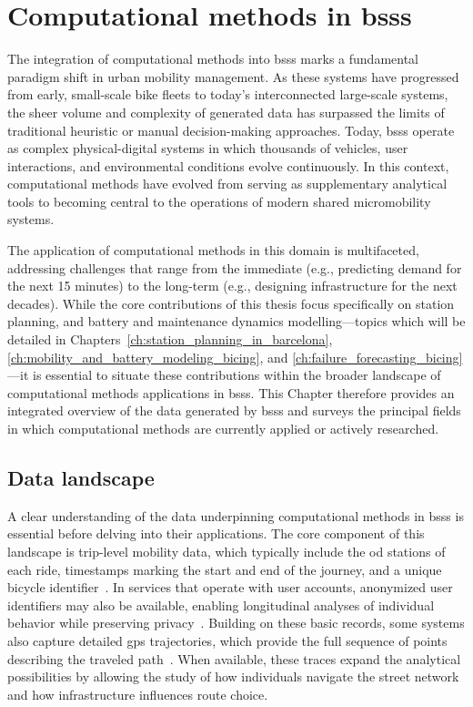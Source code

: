 \chapter[Computational methods in BSSs]{Computational methods in \acp{bss}}
\label{ch:computational_methods_in_bss}

The integration of computational methods into \acp{bss} marks a fundamental paradigm shift in urban mobility management. As these systems have progressed from early, small-scale bike fleets to today's interconnected large-scale systems, the sheer volume and complexity of generated data has surpassed the limits of traditional heuristic or manual decision-making approaches. Today, \acp{bss} operate as complex physical-digital systems in which thousands of vehicles, user interactions, and environmental conditions evolve continuously. In this context, computational methods have evolved from serving as supplementary analytical tools to becoming central to the operations of modern shared micromobility systems.

The application of computational methods in this domain is multifaceted, addressing challenges that range from the immediate (e.g., predicting demand for the next 15 minutes) to the long-term (e.g., designing infrastructure for the next decades). While the core contributions of this thesis focus specifically on station planning, and battery and maintenance dynamics modelling—topics which will be detailed in Chapters~\ref{ch:station_planning_in_barcelona}, \ref{ch:mobility_and_battery_modeling_bicing}, and \ref{ch:failure_forecasting_bicing}—it is essential to situate these contributions within the broader landscape of computational methods applications in \acp{bss}. This Chapter therefore provides an integrated overview of the data generated by \acp{bss} and surveys the principal fields in which computational methods are currently applied or actively researched.

\section[Data landscape]{Data landscape}

A clear understanding of the data underpinning computational methods in \acp{bss} is essential before delving into their applications. The core component of this landscape is trip-level mobility data, which typically include the \ac{od} stations of each ride, timestamps marking the start and end of the journey, and a unique bicycle identifier~\cite{FaghihImani2017, Zaltz2013}. In services that operate with user accounts, anonymized user identifiers may also be available, enabling longitudinal analyses of individual behavior while preserving privacy~\cite{FaghihImani2017}. Building on these basic records, some systems also capture detailed \ac{gps} trajectories, which provide the full sequence of points describing the traveled path~\cite{Talavera_Garcia2021}. When available, these traces expand the analytical possibilities by allowing the study of how individuals navigate the street network and how infrastructure influences route choice.

